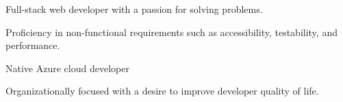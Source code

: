 

\begin{cventries}

  \cventry
    {} %
    {} %
    {} %
    {} %
    {
      \begin{cvitems} %
        \item {Full-stack web developer with a passion for solving problems.}
        \item {Proficiency in non-functional requirements such as accessibility, testability, and performance.}
        \item {Native Azure cloud developer}
        \item {Organizationally focused with a desire to improve developer quality of life.}
      \end{cvitems}
    }
\end{cventries}
